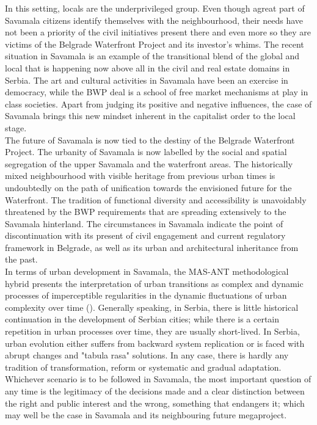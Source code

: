 \documentclass[11pt]{report}
\begin{document}
{{{In this setting, locals are the underprivileged group. Even though agreat part of Savamala citizens identify themselves with the neighbourhood, their needs have not been a priority of the civil initiatives present there and even more so they are victims of the Belgrade Waterfront Project and its investor’s whims. The recent situation in Savamala is an example of the transitional blend of the global and local that is happening now above all in the civil and real estate domains in Serbia. The art and cultural activities in Savamala have been an exercise in democracy, while the BWP deal is a school of free market mechanisms at play in class societies. Apart from judging its positive and negative influences, the case of Savamala brings this new mindset inherent in the capitalist order to the local stage.
\\

The future of Savamala is now tied to the destiny of the Belgrade Waterfront Project. The urbanity of Savamala is now labelled by the social and spatial segregation of the upper Savamala and the waterfront areas. The historically mixed neighbourhood with visible heritage from previous urban times is undoubtedly on the path of unification towards the envisioned future for the Waterfront. The tradition of functional diversity and accessibility is unavoidably threatened by the BWP requirements that are spreading extensively to the Savamala hinterland. The circumstances in Savamala indicate the point of discontinuation with its present of civil engagement and current regulatory framework in Belgrade, as well as its urban and architectural inheritance from the past.
\\

In terms of urban development in Savamala, the MAS-ANT methodological hybrid presents the interpretation of urban transitions as complex and dynamic processes of imperceptible regularities in the dynamic fluctuations of urban complexity over time (\href{Lee}{\citealt{lee_fernand_2012}}).
Generally speaking, in Serbia, there is little historical continuation in the development of Serbian cities; while there is a certain repetition in urban processes over time, they are usually short-lived. In Serbia, urban evolution either suffers from backward system replication or is faced with abrupt changes and "tabula rasa" solutions. In any case, there is hardly any tradition of transformation, reform or systematic and gradual adaptation. Whichever scenario is to be followed in Savamala, the most important question of any time is the legitimacy of the decisions made and a clear distinction between the right and public interest and the wrong, something that endangers it; which may well be the case in Savamala and its neighbouring future megaproject.

}}}
\end{document}
